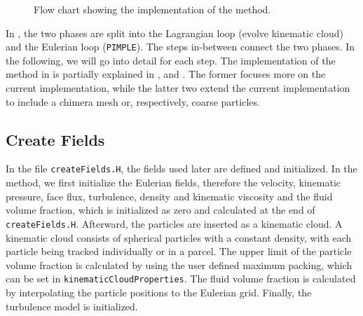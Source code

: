 \begin{figure}[h!]
    \caption{Flow chart showing the implementation of the \MP method.}
    \label{fig:FCMPPIC}
\end{figure}
In \OFns, the two phases are split into the Lagrangian loop (evolve kinematic cloud) and the Eulerian loop (\texttt{PIMPLE}). The steps in-between connect the two phases.
In the following, we will go into detail for each step.
The implementation of the \MP method in \OF is partially explained in \cite{reportMPPIC}, \cite{chimera} and \cite{ImplemInter}. The former focuses more on the current \MP implementation, while the latter two extend the current implementation to include a chimera mesh or, respectively, coarse particles.

\subsection{Create Fields}
In the file \lstinline|createFields.H|, the fields used later are defined and initialized. 
In the \MP method, we first initialize the Eulerian fields, therefore the velocity, kinematic pressure, face flux, turbulence, density and kinematic viscosity and the fluid volume fraction, which is initialized as zero and calculated at the end of \lstinline|createFields.H|.
Afterward, the particles are inserted as a kinematic cloud. 
A kinematic cloud consists of spherical particles with a constant density, with each particle being tracked individually or in a parcel.
The upper limit of the particle volume fraction is calculated by using the user defined maximum packing, which can be set in \lstinline|kinematicCloudProperties|.
The fluid volume fraction is calculated by interpolating the particle positions to the Eulerian grid.
Finally, the turbulence model is initialized.


